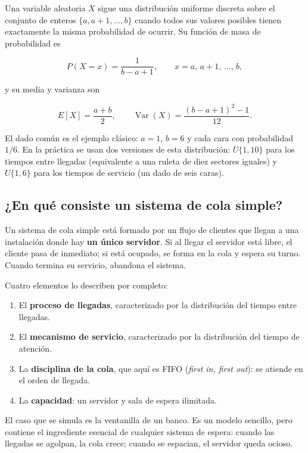 \documentclass[11pt,letterpaper]{article}
\begin{document}
Una variable aleatoria $X$ sigue una distribución uniforme discreta sobre el conjunto de enteros $\{a, a+1, \dots, b\}$ cuando todos sus valores posibles tienen exactamente la misma probabilidad de ocurrir. Su función de masa de probabilidad es

\[
P(X = x) = \frac{1}{b - a + 1}, \qquad x = a,\, a+1,\, \dots,\, b,
\]

y su media y varianza son

\[
E[X] = \frac{a+b}{2}, \qquad \operatorname{Var}(X) = \frac{(b-a+1)^2 - 1}{12}.
\]

El dado común es el ejemplo clásico: $a=1$, $b=6$ y cada cara con probabilidad $1/6$. En la práctica se usan dos versiones de esta distribución: $U\{1,10\}$ para los tiempos entre llegadas (equivalente a una ruleta de diez sectores iguales) y $U\{1,6\}$ para los tiempos de servicio (un dado de seis caras).

\subsection{¿En qué consiste un sistema de cola simple?}

Un sistema de cola simple está formado por un flujo de clientes que llegan a una instalación donde hay \textbf{un único servidor}. Si al llegar el servidor está libre, el cliente pasa de inmediato; si está ocupado, se forma en la cola y espera su turno. Cuando termina su servicio, abandona el sistema.

Cuatro elementos lo describen por completo:

\begin{enumerate}[itemsep=1pt]
    \item El \textbf{proceso de llegadas}, caracterizado por la distribución del tiempo entre llegadas.
    \item El \textbf{mecanismo de servicio}, caracterizado por la distribución del tiempo de atención.
    \item La \textbf{disciplina de la cola}, que aquí es FIFO (\emph{first in, first out}): se atiende en el orden de llegada.
    \item La \textbf{capacidad}: un servidor y sala de espera ilimitada.
\end{enumerate}

El caso que se simula es la ventanilla de un banco. Es un modelo sencillo, pero contiene el ingrediente esencial de cualquier sistema de espera: cuando las llegadas se agolpan, la cola crece; cuando se espacian, el servidor queda ocioso.
\end{document}
